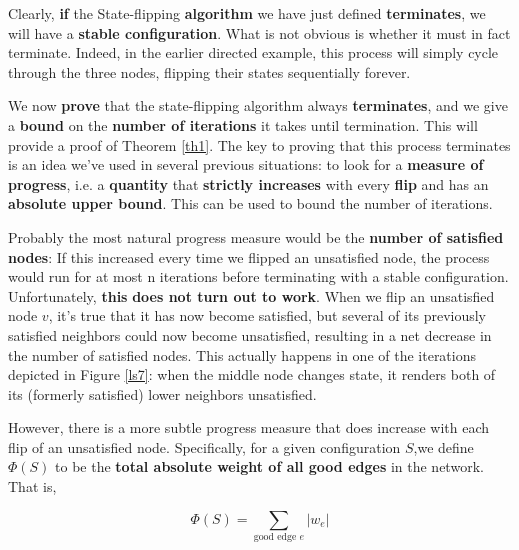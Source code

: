 \label{th1}

Clearly, \textbf{if} the State-flipping \textbf{algorithm} we have just defined \textbf{terminates}, we will have a \textbf{stable configuration}. What is not obvious is whether it must in fact terminate. Indeed, in the earlier directed example, this process will simply cycle through the three nodes, flipping their states sequentially forever. 

We now \textbf{prove} that the state-flipping algorithm always \textbf{terminates}, and we give a \textbf{bound} on the \textbf{number of iterations} it takes until termination. This will provide a proof of Theorem \ref{th1}. The key to proving that this process terminates is an idea we’ve used in several previous situations: to look for a \textbf{measure of progress}, i.e. a \textbf{quantity} that \textbf{strictly increases} with every \textbf{flip} and has an \textbf{absolute upper bound}. This can be used to bound the number of iterations. 

Probably the most natural progress measure would be the \textbf{number of satisfied nodes}: If this increased every time we flipped an unsatisfied node, the process would run for at most n iterations before terminating with a stable configuration. Unfortunately, \textbf{this} \textbf{does not turn out to work}. When we flip an unsatisfied node $v$, it’s true that it has now become satisfied, but several of its previously satisfied neighbors could now become unsatisfied, resulting in a net decrease in the number of satisfied nodes. This actually happens in one of the iterations depicted in Figure \ref{ls7}: when the middle node changes state, it renders both of its (formerly satisfied) lower neighbors unsatisfied.

However, there is a more subtle progress measure that does increase with each flip of an unsatisfied node. Specifically, for a given configuration $S$,we define $\Phi(S)$ to be the \textbf{total absolute weight of all good edges} in the network. That is,

$$
\Phi(S) = \sum_{\text{good edge $e$}} |w_e|
$$

